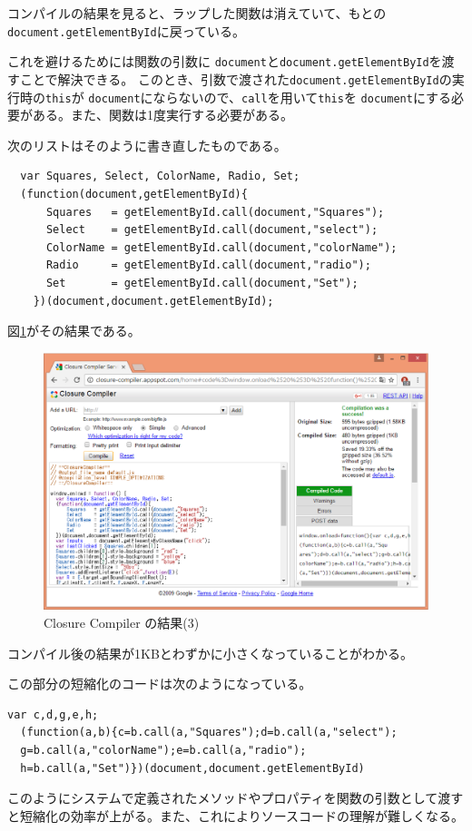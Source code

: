  コンパイルの結果を見ると、ラップした関数は消えていて、もとの
 \texttt{document.getElementById}に戻っている。
 
 これを避けるためには関数の引数に
 \texttt{document}と\texttt{document.getElementById}を渡すことで解決できる。
このとき、引数で渡された\texttt{document.getElementById}の実行時の\texttt{this}が
 \texttt{document}にならないので、\texttt{call}を用いて\texttt{this}を
 \texttt{document}にする必要がある。また、関数は1度実行する必要がある。

 次のリストはそのように書き直したものである。
\begin{Verbatim}
  var Squares, Select, ColorName, Radio, Set;
  (function(document,getElementById){
      Squares   = getElementById.call(document,"Squares");
      Select    = getElementById.call(document,"select");
      ColorName = getElementById.call(document,"colorName");
      Radio     = getElementById.call(document,"radio");
      Set       = getElementById.call(document,"Set");
	})(document,document.getElementById);
\end{Verbatim}
図\ref{closure-compiler-res04}がその結果である。
 \begin{figure}[ht]
	\begin{center}
	 \includegraphics[width=1\textwidth]{10-01closur-compiler-res04.eps}
	\end{center}
 \caption{Closure Compiler の結果(3)}\label{closure-compiler-res04}
 \end{figure}
 コンパイル後の結果が1KBとわずかに小さくなっていることがわかる。

 この部分の短縮化のコードは次のようになっている。
\begin{Verbatim}
var c,d,g,e,h;
  (function(a,b){c=b.call(a,"Squares");d=b.call(a,"select");
  g=b.call(a,"colorName");e=b.call(a,"radio");
  h=b.call(a,"Set")})(document,document.getElementById)
\end{Verbatim}
このようにシステムで定義されたメソッドやプロパティを関数の引数として渡す
と短縮化の効率が上がる。また、これによりソースコードの理解が難しくなる。

